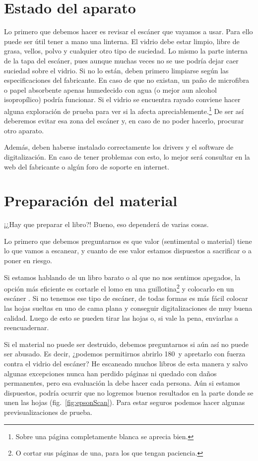\documentclass[%
	a5paper,
	10pt,
	twoside,
	openright,
	final,
]{memoir}
\begin{document}
{	\section{Estado del aparato\label{sec:scanningState}} Lo primero que debemos hacer es revisar el escáner que vayamos a usar. Para ello puede ser útil tener a mano una linterna. El vidrio debe estar limpio, libre de grasa, vellos, polvo y cualquier otro tipo de suciedad. Lo mismo la parte interna de la tapa del escáner, pues aunque muchas veces no se use podría dejar caer suciedad sobre el vidrio. Si no lo están, deben primero limpiarse según las especificaciones del fabricante. En caso de que no existan, un paño de microfibra o papel absorbente apenas humedecido con agua (o mejor aun alcohol isopropílico) podría funcionar. Si el vidrio se encuentra rayado conviene hacer alguna exploración de prueba para ver si la afecta apreciablemente.\footnote{Sobre una página completamente blanca se aprecia bien.} De ser así deberemos evitar esa zona del escáner y, en caso de no poder hacerlo, procurar otro aparato.

	Además, deben haberse instalado correctamente los drivers y el software de digitalización. En caso de tener problemas con esto, lo mejor será consultar en la web del fabricante o algún foro de soporte en internet.

	\section{Preparación del material\label{sec:scanningPreparingMaterial}} ¡¿Hay que preparar el libro?! Bueno, eso dependerá de varias cosas.

	Lo primero que debemos preguntarnos es que valor (sentimental o material) tiene lo que vamos a escanear, y cuanto de ese valor estamos dispuestos a sacrificar o a poner en riesgo.

	Si estamos hablando de un libro barato o al que no nos sentimos apegados, la opción más eficiente es cortarle el lomo en una guillotina\footnote{O cortar sus páginas de una, para los que tengan paciencia.} y colocarlo en un escáner \adf. Si no tenemos ese tipo de escáner, de todas formas es más fácil colocar las hojas sueltas en uno de cama plana y conseguir digitalizaciones de muy buena calidad. Luego de esto se pueden tirar las hojas o, si vale la pena, enviarlas a reencuadernar.

	Si el material no puede ser destruido, debemos preguntarnos si aún así no puede ser abusado. Es decir, ¿podemos permitirnos abrirlo 180\textdegree\ y apretarlo con fuerza contra el vidrio del escáner? He escaneado muchos libros de esta manera y salvo algunas excepciones nunca han perdido páginas ni quedado con daños permanentes, pero esa evaluación la debe hacer cada persona. %
	Aún si estamos dispuestos, podría ocurrir que no logremos buenos resultados en la parte donde se unen las hojas (fig.~\ref{fig:epsonScan}). Para estar seguros podemos hacer algunas previsualizaciones de prueba.

}
\end{document}
